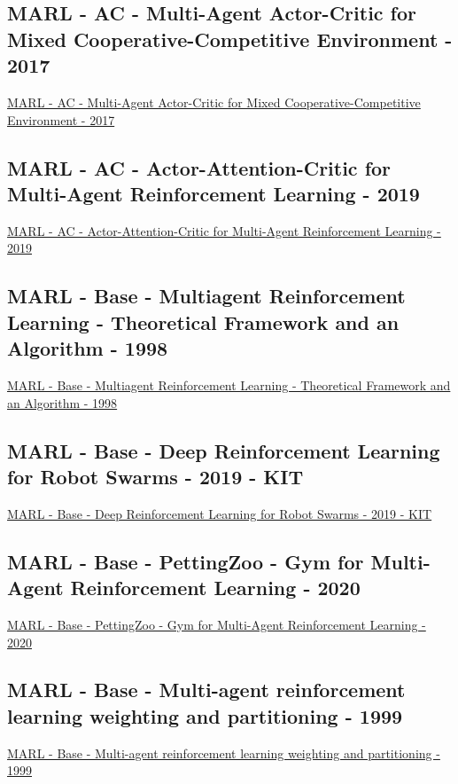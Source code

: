 \subsection{MARL - AC - Multi-Agent Actor-Critic for Mixed Cooperative-Competitive Environment - 2017}
\href{https://arxiv.org/abs/1706.02275}{MARL - AC - Multi-Agent Actor-Critic for Mixed Cooperative-Competitive Environment - 2017}

\subsection{MARL - AC - Actor-Attention-Critic for Multi-Agent Reinforcement Learning - 2019}
\href{http://proceedings.mlr.press/v97/iqbal19a.html}{MARL - AC - Actor-Attention-Critic for Multi-Agent Reinforcement Learning - 2019}

\subsection{MARL - Base - Multiagent Reinforcement Learning - Theoretical Framework and an Algorithm - 1998}
\href{https://dl.acm.org/doi/abs/10.5555/645527.657296}{MARL - Base - Multiagent Reinforcement Learning - Theoretical Framework and an Algorithm - 1998}

\subsection{MARL - Base - Deep Reinforcement Learning for Robot Swarms - 2019 - KIT}
\href{https://publikationen.bibliothek.kit.edu/1000118251}{MARL - Base - Deep Reinforcement Learning for Robot Swarms - 2019 - KIT}

\subsection{MARL - Base - PettingZoo - Gym for Multi-Agent Reinforcement Learning - 2020}
\href{https://arxiv.org/abs/2009.14471}{MARL - Base - PettingZoo - Gym for Multi-Agent Reinforcement Learning - 2020}

\subsection{MARL - Base - Multi-agent reinforcement learning weighting and partitioning - 1999}
\href{https://www.sciencedirect.com/science/article/pii/S0893608099000246}{MARL - Base - Multi-agent reinforcement learning weighting and partitioning - 1999}

